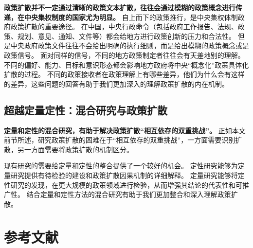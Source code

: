 \documentclass[
  12pt,
]{ctexart}
\begin{document}
\textbf{政策扩散并不一定通过清晰的政策文本扩散，往往会通过模糊的政策概念进行传递，在中央集权制度的国家尤为明显。}
自上而下的政策推行，是中央集权体制政府政策扩散的重要途径。
在中国，中央行政命令（包括政府工作报告、法规、政策、规划、意见、通知、文件等）都会给地方进行政策创新的压力和合法性。
但是中央政府政策文件往往不会给出明确的执行细则，而是给出模糊的政策概念或是政策信号。
面对同样的信号，不同的地方政策制定者往往会有天差地别的理解。
不同的偏好、能力、目标和意识形态都会影响地方政府将中央``概念化''政策具体化扩散的过程。
不同的政策接收者在政策理解上有哪些差异，他们为什么会有这样的差异，这些问题的回答有助于我们更加深入的理解政策扩散的内在机制。

\hypertarget{ux8d85ux8d8aux5b9aux91cfux5b9aux6027ux6df7ux5408ux7814ux7a76ux4e0eux653fux7b56ux6269ux6563}{%
\subsection{超越定量定性：混合研究与政策扩散}\label{ux8d85ux8d8aux5b9aux91cfux5b9aux6027ux6df7ux5408ux7814ux7a76ux4e0eux653fux7b56ux6269ux6563}}

\textbf{定量和定性的混合研究，有助于解决政策扩散``相互依存的双重挑战''。}
正如本文前节所述，研究政策扩散的困难在于``相互依存的双重挑战''，一方面需要识别扩散，另一方面需要将政策扩散的机制区分。

现有研究的需要给定量和定性的整合提供了一个较好的机会。
定性研究能够为定量研究提供有待检验的建设和政策扩散因果机制的详细解释。
定量研究能够将定性研究的发现，在更大规模的政策领域进行检验，从而增强其结论的代表性和可推广性。
结合定量和定性方法的混合研究有助于我们更加整合和深入理解政策扩散。

\newpage

\hypertarget{ux53c2ux8003ux6587ux732e}{%
\section{参考文献}\label{ux53c2ux8003ux6587ux732e}}
\end{document}
